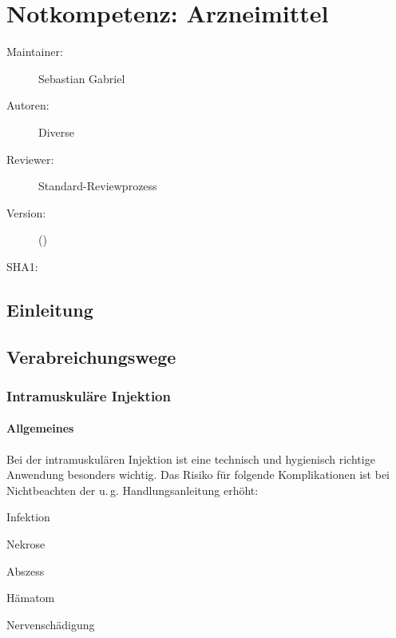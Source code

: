 \def\ChapterCode{NKA}
\chapter
[\CO{[NKA]} Notkompetenz: Arzneimittel]
{Notkompetenz: Arzneimittel}
\label{chp:NKA}




\ChapterIntro
{%

}
{%
\begin{description}
  \item[Maintainer:] Sebastian Gabriel
  \item[Autoren:] Diverse
  \item[Reviewer:] Standard-Reviewprozess
  \item[Version:] {\DocVersion} ({\DocVersionInfo})
  \item[SHA1:] {\DocGitCommit}
\end{description}

{\TxTeilkapitelAASS}
}

\section{Einleitung}

\section{Verabreichungswege}

\subsection{Intramuskuläre Injektion}

\subsubsection{Allgemeines}
Bei der intramuskulären Injektion ist eine
technisch und hygienisch richtige Anwendung besonders wichtig. Das
Risiko für folgende Komplikationen ist bei Nichtbeachten der u.\,g.
Handlungsanleitung erhöht:
 
\begin{compactenum}
\item Infektion
\item Nekrose
\item Abszess
\item Hämatom
\item Nervenschädigung
\end{compactenum}


